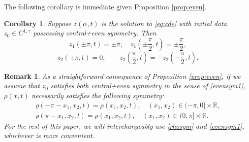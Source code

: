 \documentclass[11pt]{article}
\numberwithin{equation}{section}
\newtheorem{cor}[thm]{Corollary}
\newtheorem{rmk}[thm]{Remark}
\newcommand{\R}{\mathbb{R}}
\begin{document}
The following corollary is immediate given Proposition \ref{prop:even}.
\begin{cor}\label{cor:positions}
    Suppose $z(\alpha,t)$ is the solution to \eqref{eq:cde} with initial data $z_0 \in C^{1,\gamma}$ possessing central+even symmetry. Then
    $$
    z_1(\pm\pi,t) = \pm\pi, \quad z_1\left(\pm\frac{\pi}{2},t\right) = \pm\frac{\pi}{2}, 
    $$
    $$
    z_2(\pm\pi,t) = 0, \quad \quad z_2\left(\frac{\pi}{2},t\right) = -z_2\left(-\frac{\pi}{2},t\right).
    $$
\end{cor}

\begin{rmk}
    As a straightforward consequence of Proposition \ref{prop:even}, if we assume that $z_0$ satisfies both central+even symmetry in the sense of \eqref{evensym1}, $\rho(x,t)$ necessarily satisfies the following symmetry:
    \begin{equation}
        \label{rhosym}
        \begin{split}
            \rho(-\pi-x_1,x_2,t) = \rho(x_1,x_2,t),\quad (x_1,x_2) \in (-\pi,0]\times \R,\\
             \rho(\pi-x_1,x_2,t) = \rho(x_1,x_2,t),\quad (x_1,x_2) \in (0,\pi]\times \R.
        \end{split}
    \end{equation}
    For the rest of this paper, we will interchangeably use \eqref{rhosym} and \eqref{evensym1}, whichever is more convenient.
\end{rmk}
\end{document}
